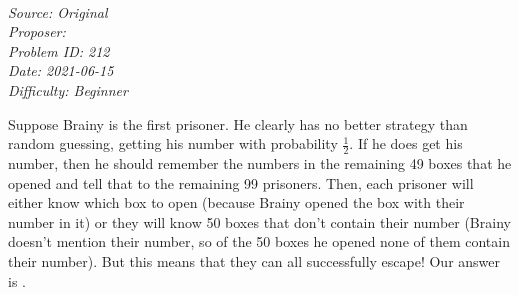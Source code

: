 \SSbreak\\
\emph{Source: Original}\\
\emph{Proposer: \Pbrain}\\ %
\emph{Problem ID: 212}\\
\emph{Date: 2021-06-15}\\
\emph{Difficulty: Beginner}\\
\SSbreak

\bigskip

\begin{solution}\hfil\medskip
	
	Suppose Brainy is the first prisoner. He clearly has no better strategy than random guessing, getting his number with probability $\frac{1}{2}$. 
	If he does get his number, then he should remember the numbers in the remaining 49 boxes that he opened and tell that to the remaining 99 prisoners.
	Then, each prisoner will either know which box to open (because Brainy opened the box with their number in it) or they will know 50 boxes that don't contain
	their number (Brainy doesn't mention their number, so of the 50 boxes he opened none of them contain their number). But this means that they can all
	successfully escape! Our answer is .
\end{solution}\bigskip
